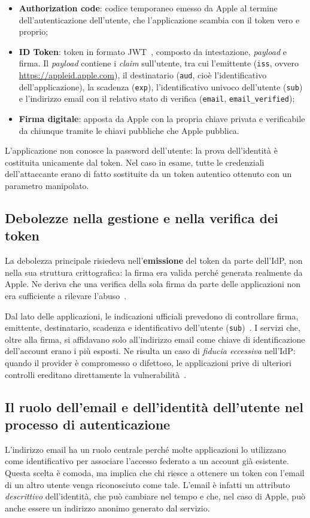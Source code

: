 \begin{itemize}
    \item \textbf{Authorization code}: codice temporaneo emesso da Apple al
    termine dell'autenticazione dell'utente, che l'applicazione scambia con il
    token vero e proprio;
    \item \textbf{ID Token}: token in formato JWT~\cite{rfc7519}, composto da
    intestazione, \emph{payload} e firma. Il \emph{payload} contiene i
    \emph{claim} sull'utente, tra cui l'emittente (\texttt{iss}, ovvero
    \url{https://appleid.apple.com}), il destinatario (\texttt{aud}, cioè
    l'identificativo dell'applicazione), la scadenza (\texttt{exp}), l'identificativo
    univoco dell'utente (\texttt{sub}) e l'indirizzo email con il relativo stato
    di verifica (\texttt{email}, \texttt{email\_verified});
    \item \textbf{Firma digitale}: apposta da Apple con la propria chiave
    privata e verificabile da chiunque tramite le chiavi pubbliche che Apple
    pubblica.
\end{itemize}

L'applicazione non conosce la password dell'utente: la prova dell'identità è
costituita unicamente dal token. Nel caso in esame, tutte le credenziali
dell'attaccante erano di fatto sostituite da un token autentico ottenuto con un
parametro manipolato.

\subsection{Debolezze nella gestione e nella verifica dei token}
La debolezza principale risiedeva nell'\textbf{emissione} del token da parte
dell'IdP, non nella sua struttura crittografica: la firma era valida perché
generata realmente da Apple. Ne deriva che una verifica della sola firma da parte
delle applicazioni non era sufficiente a rilevare l'abuso~\cite{jain-apple-2020}.

Dal lato delle applicazioni, le indicazioni ufficiali prevedono di controllare
firma, emittente, destinatario, scadenza e identificativo dell'utente
(\texttt{sub})~\cite{apple-verifying-user}. I servizi che, oltre alla firma, si
affidavano solo all'indirizzo email come chiave di identificazione dell'account
erano i più esposti. Ne risulta un caso di \emph{fiducia eccessiva} nell'IdP:
quando il provider è compromesso o difettoso, le applicazioni prive di ulteriori
controlli ereditano direttamente la vulnerabilità~\cite{nist800-63c}.

\subsection{Il ruolo dell'email e dell'identità dell'utente nel processo di autenticazione}
L'indirizzo email ha un ruolo centrale perché molte applicazioni lo utilizzano
come identificativo per associare l'accesso federato a un account già
esistente. Questa scelta è comoda, ma implica che chi riesce a ottenere un token
con l'email di un altro utente venga riconosciuto come tale. L'email è infatti un
attributo \emph{descrittivo} dell'identità, che può cambiare nel tempo e che,
nel caso di Apple, può anche essere un indirizzo anonimo generato dal
servizio.

